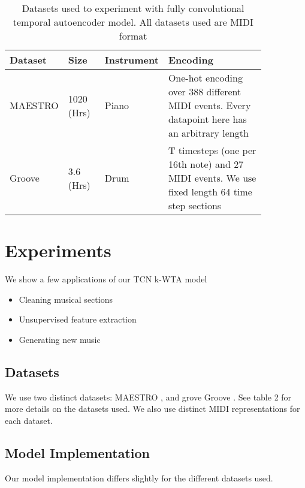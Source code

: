 \documentclass[11pt,a4paper]{article}
\begin{document}
\begin{table*}[ht]
    \centering
    \begin{tabular}{p{0.15\linewidth} | p{0.15\linewidth} | p{0.1\linewidth}  | p{0.45\linewidth} }
      Dataset  & Size  & Instrument &  Encoding\\ \hline
      MAESTRO \citep{Gusfield:97}  & 1020 (Hrs)   & Piano &  One-hot encoding over 388 different MIDI events. Every datapoint here has an arbitrary length \\
        \hline
        Groove \citet{Gusfield:97} & 3.6 (Hrs)  & Drum &  T timesteps (one per 16th note) and 27 MIDI events. We use fixed length 64 time step sections\\
    \end{tabular}
    \caption{Datasets used to experiment with fully convolutional temporal autoencoder model. All datasets used are MIDI format }
    \label{tab:my_label}
\end{table*}




\section{Experiments}
\label{ssec:experiments}

We show a few applications of our TCN k-WTA model

\begin{itemize}
\item Cleaning musical sections
\item Unsupervised feature extraction 
\item Generating new music
\end{itemize}


\subsection{Datasets}
\label{ssec:experiments}

We use two distinct datasets: MAESTRO  \citep{Gusfield:97}, and  grove Groove  \citep{Gusfield:97} . See table 2 for more details on the datasets used. We also use distinct MIDI representations for each dataset. 



\subsection{Model Implementation}
Our model implementation differs slightly for the different datasets used. 
\end{document}
